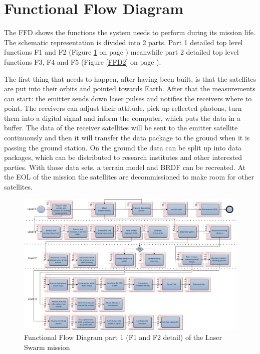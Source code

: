 \section{Functional Flow Diagram}
\label{section_FFD}
The \ac{FFD} shows the functions the system needs to perform during its mission life. The schematic representation is divided into 2 parts. Part 1 detailed top level functions F1 and F2 (Figure \ref{FFD1} on page \pageref{FFD1}) meanwhile part 2 detailed top level functions F3, F4 and F5 (Figure \ref{FFD2} on page \pageref{FFD2}).

The first thing that needs to happen, after having been built, is that the satellites are put into their orbits and pointed towards Earth. After that the measurements can start: the emitter sends down laser pulses and notifies the receivers where to point. The receivers can adjust their attitude, pick up reflected photons, turn them into a digital signal and inform the computer, which puts the data in a buffer. The data of the receiver satellites will be sent to the emitter satellite continuously and then it will transfer the data package to the ground when it is passing the ground station. On the ground the data can be split up into data packages, which can be distributed to research institutes and other interested parties. With those data sets, a terrain model and \ac{BRDF} can be recreated. At the \ac{EOL} of the mission the satellites are decommissioned to make room for other satellites.

\begin{landscape}
\begin{figure}[ht!]
\centering
\includegraphics[width=1.3\textheight]{chapters/img/FFD1.jpg}
\caption{Functional Flow Diagram part 1 (F1 and F2 detail) of the Laser Swarm mission}
\label{FFD1}
\end{figure}
\end{landscape}

